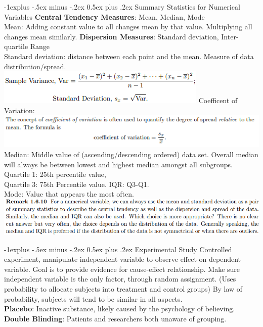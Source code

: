 \documentclass[10pt, landscape]{article}
\makeatletter
\renewcommand{\subsection}{\@startsection{subsection}{2}{0mm}%
                                {-1explus -.5ex minus -.2ex}%
                                {0.5ex plus .2ex}%
                                {\normalfont\normalsize\bfseries}}
\makeatother
\begin{document}
\begin{multicols*}{4}
\subsection{Summary Statistics for Numerical Variables}
	\textbf{Central Tendency Measures}: Mean, Median, Mode \\
	Mean: Adding constant value to all changes mean by that value. Multiplying all changes mean similarly.
	\textbf{Dispersion Measures}: Standard deviation, Inter-quartile Range\\
	Standard deviation: distance between each point and the mean. Measure of data distribution/spread.
	\includegraphics[width = \linewidth]{variance}
	Coefficent of Variation: 
	\includegraphics[width = \linewidth]{variancecoefficient}
	Median: Middle value of (ascending/descending ordered) data set. Overall median will always be between lowest and highest median amongst all subgroups.\\
	Quartile 1: 25th percentile value, \\
	Quartile 3: 75th Percentile value. IQR: Q3-Q1.\\
	Mode: Value that appears the most often.
	\includegraphics[width = \linewidth]{meanmediancomment}

\subsection{Experimental Study}
	Controlled experiment, manipulate independent variable to observe effect on dependent variable. Goal is to provide evidence for cause-effect relationship. Make sure independent variable is the only factor, through random assignment. (Uses probability to allocate subjects into treatment and control groups) By law of probability, subjects will tend to be similar in all aspects. \\
	\textbf{Placebo}: Inactive substance, likely caused by the psychology of believing. \\
	\textbf{Double Blinding}: Patients and researchers both unaware of grouping. \\


\end{multicols*}
\end{document}
